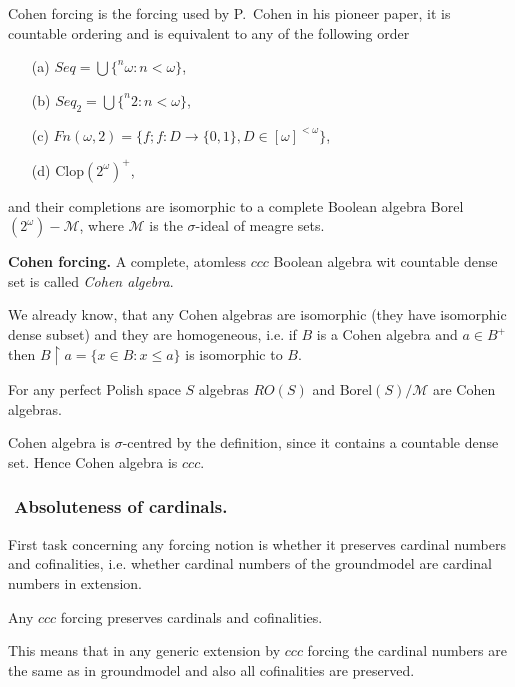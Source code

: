 Cohen forcing is the forcing used by P.~Cohen in his pioneer paper,
it is countable ordering and is equivalent to any of the following
order
\begin{itemize}
 \item[(a)]  $Seq = \bigcup\{ ^n\omega:n<\omega\}$,
 \item[(b)]  $Seq_2 = \bigcup\{ ^n2:n<\omega\}$,
 \item[(c)]  $Fn(\omega,2)=\{f;f:D\to\{0,1\},D\in[\omega]^{<\omega}\}$,
 \item[(d)] Clop$(2^\omega)^+$,
\end{itemize}
and their completions are isomorphic to a complete Boolean algebra
Borel$(2^\omega) - \mathcal M$, where $\mathcal M$ is the $\sigma$-ideal
of meagre sets.

\begin{definition}{\bf Cohen forcing.}\label{cohen}
 A complete, atomless $ccc$ Boolean algebra wit countable dense set is
called \emph{Cohen algebra}.
\end{definition}

We already know, that any Cohen algebras are isomorphic (they have
isomorphic dense subset) and they are homogeneous, i.e. if $B$ is
a Cohen algebra and $a \in B^+$ then $B\upharpoonright a = \{x \in B : x \leq a \}$
is isomorphic to $B$.

\begin{example}
 For any perfect Polish space $S$ algebras $RO(S)$ and
Borel$(S) / \mathcal M$ are Cohen algebras.
\end{example}

Cohen algebra is $\sigma$-centred by the definition, since it
contains a countable dense set. Hence Cohen algebra is $ccc$.

\subsubsection{${}$ \hspace{-1em}Absoluteness of cardinals.}

First task concerning any forcing notion is whether it preserves
cardinal numbers and cofinalities, i.e. whether cardinal numbers
of the groundmodel are cardinal numbers in extension.

\begin{proposition}\label{ABScardinals}
 Any $ccc$ forcing preserves cardinals and cofinalities.
\end{proposition}

This means that in any generic extension by $ccc$ forcing the
cardinal numbers are the same as in groundmodel and also
all cofinalities are preserved.

